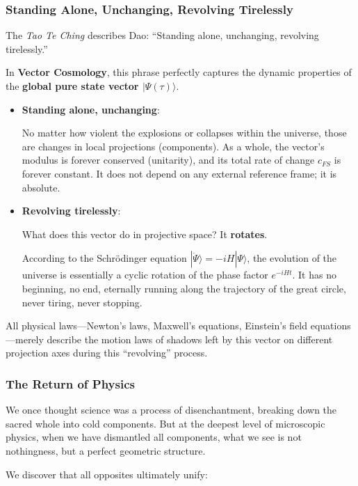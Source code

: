 \subsubsection{Standing Alone, Unchanging, Revolving Tirelessly}

The \textit{Tao Te Ching} describes Dao: ``Standing alone, unchanging, revolving tirelessly.''

In \textbf{Vector Cosmology}, this phrase perfectly captures the dynamic properties of the \textbf{global pure state vector $|\Psi(\tau)\rangle$}.

\begin{itemize}
\item \textbf{Standing alone, unchanging}:

    No matter how violent the explosions or collapses within the universe, those are changes in local projections (components). As a whole, the vector's modulus is forever conserved (unitarity), and its total rate of change $c_{FS}$ is forever constant. It does not depend on any external reference frame; it is absolute.

\item \textbf{Revolving tirelessly}:

    What does this vector do in projective space? It \textbf{rotates}.

    According to the Schrödinger equation $|\dot{\Psi}\rangle = -iH|\Psi\rangle$, the evolution of the universe is essentially a cyclic rotation of the phase factor $e^{-iHt}$. It has no beginning, no end, eternally running along the trajectory of the great circle, never tiring, never stopping.
\end{itemize}

All physical laws---Newton's laws, Maxwell's equations, Einstein's field equations---merely describe the motion laws of shadows left by this vector on different projection axes during this ``revolving'' process.

\subsubsection{The Return of Physics}

We once thought science was a process of disenchantment, breaking down the sacred whole into cold components. But at the deepest level of microscopic physics, when we have dismantled all components, what we see is not nothingness, but a perfect geometric structure.

We discover that all opposites ultimately unify:

